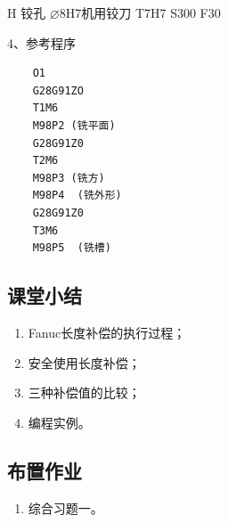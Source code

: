 	H 铰孔      $\varnothing$8H7机用铰刀  T7H7 S300 F30
	
	
	4、参考程序
	\begin{lstlisting}
	O1
	G28G91ZO
	T1M6
	M98P2 (铣平面)
	G28G91Z0
	T2M6
	M98P3 (铣方)
	M98P4  (铣外形)
	G28G91Z0
	T3M6
	M98P5  (铣槽)
\end{lstlisting}

\subsection{课堂小结}
\begin{enumerate}[1、]
\item Fanuc长度补偿的执行过程；
\item 安全使用长度补偿；
\item 三种补偿值的比较；
\item 编程实例。
\end{enumerate}

\vfill
\subsection{布置作业}
\begin{enumerate}[1、]
	\item 综合习题一。
\end{enumerate}
\vfill